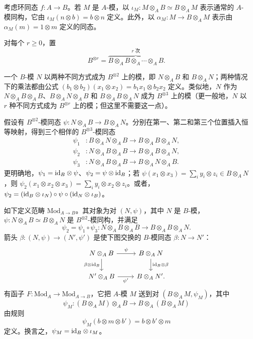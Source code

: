 考虑环同态 $f\colon A\to B$。若 $M$ 是 $A$-模，以 $\iota_M\colon M\otimes_A B\simeq B\otimes_A M$ 表示通常的 $A$-模同构，它由 $\iota_M(n\otimes b)=b\otimes n$ 定义。此外，以 $\alpha_M\colon M\to B\otimes_A M$ 表示由 $\alpha_M(m)=1\otimes m$ 定义的同态。

对每个 $r\geq0$，置
\[
 B^{\otimes r}=\overbrace{B\otimes_A B\otimes_A\cdots\otimes_A B}^{r\text{ 次}}.
\]

一个 $B$-模 $N$ 以两种不同方式成为 $B^{\otimes2}$ 上的模，即 $N\otimes_A B$ 和 $B\otimes_A N$；两种情况下的乘法都由公式
$(b_1\otimes b_2)(x_1\otimes x_2)=b_1x_1\otimes b_2x_2$ 定义。类似地，$N$ 作为 $N\otimes_A B\otimes_A B$、$B\otimes_A N\otimes_A B$ 和 $B\otimes_A B\otimes_A N$ 成为 $B^{\otimes3}$ 上的模（更一般地，$N$ 以 $r$ 种不同方式成为 $B^{\otimes r}$ 上的模；但这里不需要这一点）。

假设有 $B^{\otimes2}$-模同态 $\psi\colon N\otimes_A B\to B\otimes_A N$。分别在第一、第二和第三个位置插入恒等映射，得到三个相伴的 $B^{\otimes3}$-模同态
\[
\begin{aligned}
 \psi_1&\colon B\otimes_A N\otimes_A B\longrightarrow B\otimes_A B\otimes_A N,\\
 \psi_2&\colon N\otimes_A B\otimes_A B\longrightarrow B\otimes_A B\otimes_A N,\\
 \psi_3&\colon N\otimes_A B\otimes_A B\longrightarrow B\otimes_A N\otimes_A B.
\end{aligned}
\]
更明确地，$\psi_1=\mathrm{id}_B\otimes\psi$、$\psi_2=\psi\otimes\mathrm{id}_B$；若 $\psi(x_1\otimes x_3)=\sum_i y_i\otimes z_i\in B\otimes_A N$，则
$\psi_2(x_1\otimes x_2\otimes x_3)=\sum_i y_i\otimes x_2\otimes z_i$。或者，$\psi_2=(\mathrm{id}_B\otimes\iota_N)\circ\psi\circ(\mathrm{id}_N\otimes\iota_B)$。

如下定义范畴 $\mathrm{Mod}_{A\to B}$。其对象为对 $(N,\psi)$，其中 $N$ 是 $B$-模，$\psi\colon N\otimes_A B\simeq B\otimes_A N$ 是 $B^{\otimes2}$-模同构，并满足
\[
 \psi_2=\psi_1\circ\psi_3\colon N\otimes_A B\otimes_A B\longrightarrow B\otimes_A B\otimes_A N.
\]
箭头 $\beta\colon(N,\psi)\to(N',\psi')$ 是使下图交换的 $B$-模同态 $\beta\colon N\to N'$：
\[
\begin{tikzcd}
 N\otimes_A B\arrow[r,"{\psi}"]\arrow[d,"{\beta\otimes\id_B}"']&B\otimes_A N\arrow[d,"{\id_B\otimes\beta}"]\\
 N'\otimes_A B\arrow[r,"{\psi'}"']&B\otimes_A N'.
\end{tikzcd}
\]
有函子 $F\colon\mathrm{Mod}_A\to\mathrm{Mod}_{A\to B}$，它把 $A$-模 $M$ 送到对 $(B\otimes_A M,\psi_M)$，其中
\[
 \psi_M\colon(B\otimes_A M)\otimes_A B\longrightarrow B\otimes_A(B\otimes_A M)
\]
由规则
\[
 \psi_M(b\otimes m\otimes b')=b\otimes b'\otimes m
\]
定义。换言之，$\psi_M=\mathrm{id}_B\otimes\iota_M$。

